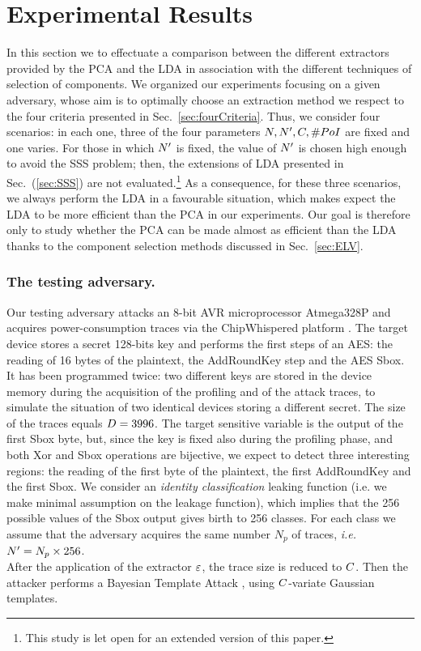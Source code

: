 \section{Experimental Results}\label{sec:experiments}

In this section we to effectuate a comparison between the different extractors provided by the PCA and the LDA in association with the different techniques of selection of components. We organized our experiments focusing on a given adversary, whose aim is to optimally choose an extraction method we respect to the four criteria presented in Sec.~\ref{sec:fourCriteria}. Thus, we consider four scenarios: in each one, three of the four parameters $\numTraces[], \numTraces[]', \newTraceLength, \numPoI$ are fixed and one varies. For those in which $\numTraces[]'$ is fixed, the value of $\numTraces[]'$ is chosen high enough to avoid the SSS problem; then, the extensions of LDA presented in Sec.~(\ref{sec:SSS}) are not evaluated.\footnote{This study is let open for an extended version of this paper.} As a consequence, for these three scenarios, we always perform the LDA in a favourable situation, which makes expect the LDA to be more efficient than the PCA in our experiments. Our goal is therefore only to study whether the PCA can be made almost as efficient than the LDA thanks to the component selection methods discussed in Sec.~\ref{sec:ELV}. 

\subsubsection{The testing adversary.}  Our testing adversary attacks an 8-bit AVR microprocessor Atmega328P and acquires power-consumption traces via the ChipWhispered platform \cite{o2014chipwhisperer}. The target device stores a secret 128-bits key and performs the first steps of an AES: the reading of 16 bytes of the plaintext, the AddRoundKey step and the AES Sbox. It has been programmed twice: two different keys are stored in the device memory during the acquisition of the profiling and of the attack traces, to simulate the situation of two identical devices storing a different secret. The size of the traces equals $\traceLength = 3996$. The target sensitive variable is the output of the first Sbox byte, but, since the key is fixed also during the profiling phase, and both Xor and Sbox operations are bijective, we expect to detect three interesting regions: the reading of the first byte of the plaintext, the first AddRoundKey and the first Sbox. We consider an {\em identity classification} leaking function (i.e. we make minimal assumption on the leakage function), which implies that the 256 possible values of the Sbox output gives birth to 256 classes. For each class we assume that the adversary acquires the same number $N_p$ of traces, \textit{i.e.} $\numTraces[]' = N_p\times 256$.\\
After the application of the extractor $\extract$, the trace size is reduced to $\newTraceLength$. Then the attacker performs a Bayesian Template Attack \cite{Chari2003}, using $\newTraceLength$-variate Gaussian templates.



